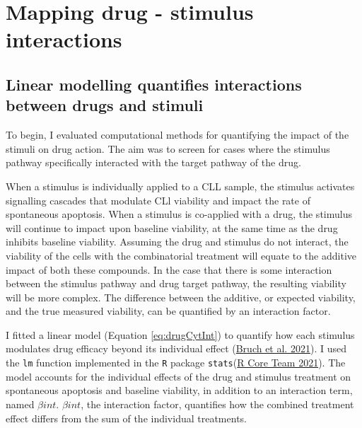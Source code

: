\documentclass[11pt, a4paper, twosided]{book}
\begin{document}
\hypertarget{mapping-interactions}{%
\section{Mapping drug - stimulus interactions}\label{mapping-interactions}}

\hypertarget{drug-stimulus-linear-model}{%
\subsection{Linear modelling quantifies interactions between drugs and stimuli}\label{drug-stimulus-linear-model}}

To begin, I evaluated computational methods for quantifying the impact of the stimuli on drug action. The aim was to screen for cases where the stimulus pathway specifically interacted with the target pathway of the drug.

When a stimulus is individually applied to a CLL sample, the stimulus activates signalling cascades that modulate CLl viability and impact the rate of spontaneous apoptosis. When a stimulus is co-applied with a drug, the stimulus will continue to impact upon baseline viability, at the same time as the drug inhibits baseline viability. Assuming the drug and stimulus do not interact, the viability of the cells with the combinatorial treatment will equate to the additive impact of both these compounds. In the case that there is some interaction between the stimulus pathway and drug target pathway, the resulting viability will be more complex. The difference between the additive, or expected viability, and the true measured viability, can be quantified by an interaction factor.

I fitted a linear model (Equation \eqref{eq:drugCytInt}) to quantify how each stimulus modulates drug efficacy beyond its individual effect (\protect\hyperlink{ref-Giles2021}{Bruch et al. 2021}). I used the \texttt{lm} function implemented in the \texttt{R} package \texttt{stats}(\protect\hyperlink{ref-R-base}{R Core Team 2021}). The model accounts for the individual effects of the drug and stimulus treatment on spontaneous apoptosis and baseline viability, in addition to an interaction term, named \(\beta{int}\). \(\beta{int}\), the interaction factor, quantifies how the combined treatment effect differs from the sum of the individual treatments.
\end{document}
